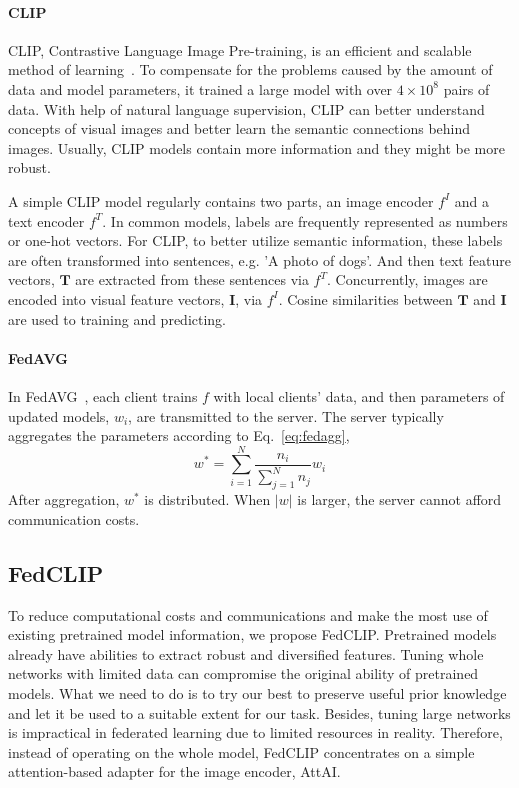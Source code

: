 \documentclass[11pt]{article}
\newcommand{\equationname}{Eq.}
\newcommand{\method}{FedCLIP\xspace}
\newcommand{\mecom}{AttAI\xspace}
\newcommand{\wjd}[1]{{\color{cyan}{[(WJD): #1]}}}
\begin{document}
\paragraph{CLIP}

CLIP, Contrastive Language Image Pre-training, is an efficient and scalable method of learning~\cite{radford2021learning}.
To compensate for the problems caused by the amount of data and model parameters, it trained a large model with over $4\times 10^8$ pairs of data.
With help of natural language supervision, CLIP can better understand concepts of visual images and better learn the semantic connections behind images.
Usually, CLIP models contain more information and they might be more robust.

A simple CLIP model regularly contains two parts, an image encoder $f^I$ and a text encoder $f^T$.
In common models, labels are frequently represented as numbers or one-hot vectors.
For CLIP, to better utilize semantic information, these labels are often transformed into sentences, e.g. 'A photo of dogs'.
And then text feature vectors, $\mathbf{T}$ are extracted from these sentences via $f^T$.
Concurrently, images are encoded into visual feature vectors, $\mathbf{I}$, via $f^I$.
Cosine similarities between $\mathbf{T}$ and $\mathbf{I}$ are used to training and predicting.

\paragraph{FedAVG}
In FedAVG~\cite{mcmahan2017communication}, each client trains $f$ with local clients' data, and then parameters of updated models, $w_i$, are transmitted to the server.
The server typically aggregates the parameters according to \equationname~\ref{eq:fedagg},
\begin{equation}
    w^*=\sum_{i=1}^N \frac{n_i}{\sum_{j=1}^N n_j} w_i
    \label{eq:fedagg}
\end{equation}
After aggregation, $w^*$ is distributed. %
When $|w|$ is larger, the server cannot afford communication costs.

\subsection{\method}
To reduce computational costs and communications and make the most use of existing pretrained model information, we propose \method.
Pretrained models already have abilities to extract robust and diversified features.
Tuning whole networks with limited data can compromise the original ability of pretrained models.
What we need to do is to try our best to preserve useful prior knowledge and let it be used to a suitable extent for our task.
Besides, tuning large networks is impractical in federated learning due to limited resources in reality.
Therefore, instead of operating on the whole model, \method concentrates on a simple attention-based adapter for the image encoder, \mecom.
\end{document}
